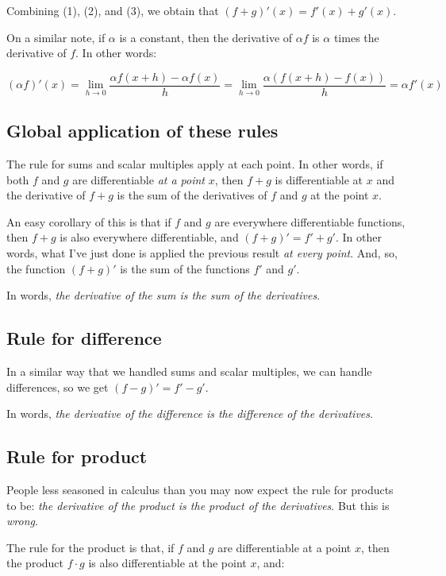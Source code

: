 \documentclass[10pt]{amsart}
\begin{document}
Combining (1), (2), and (3), we obtain that $(f + g)'(x) = f'(x) + g'(x)$.

On a similar note, if $\alpha$ is a constant, then the derivative of
$\alpha f$ is $\alpha$ times the derivative of $f$. In other words:

\begin{equation*}
  (\alpha f)'(x) = \lim_{h \to 0} \frac{\alpha f(x + h) - \alpha f(x)}{h} = \lim_{h \to 0} \frac{\alpha(f(x+h) - f(x))}{h} = \alpha f'(x)
\end{equation*}

\subsection{Global application of these rules}

The rule for sums and scalar multiples apply at each point. In other
words, if both $f$ and $g$ are differentiable {\em at a point} $x$,
then $f + g$ is differentiable at $x$ and the derivative of $f + g$ is
the sum of the derivatives of $f$ and $g$ at the point $x$.

An easy corollary of this is that if $f$ and $g$ are everywhere
differentiable functions, then $f + g$ is also everywhere
differentiable, and $(f + g)' = f' + g'$. In other words, what I've
just done is applied the previous result {\em at every point}. And,
so, the function $(f + g)'$ is the sum of the functions $f'$ and $g'$.

In words, {\em the derivative of the sum is the sum of the derivatives}.

\subsection{Rule for difference}

In a similar way that we handled sums and scalar multiples, we can
handle differences, so we get $(f - g)' = f' - g'$.

In words, {\em the derivative of the difference is the difference of
the derivatives}.
\subsection{Rule for product}

People less seasoned in calculus than you may now expect the rule for
products to be: {\em the derivative of the product is the product of
the derivatives}. But this is {\em wrong}.

The rule for the product is that, if $f$ and $g$ are
differentiable at a point $x$, then the product $f \cdot g$ is also
differentiable at the point $x$, and:
\end{document}
